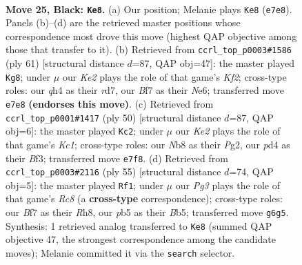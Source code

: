 \documentclass[11pt]{article}
\begin{document}
\clearpage

\begin{figure}[p]\centering
\begin{subfigure}{0.46\textwidth}\centering
\resizebox{\linewidth}{!}{%
\newchessgame
\chessboard[
  setfen={rn6/pp2kb2/1p2p1p1/1P1pP3/1P1P3Q/2N4B/8/4K1N1 b - - 4 25},
  showmover=false,
  pgfstyle=straightmove, color=movearrow, markmove={e7-e8}
]}
\caption{}
\end{subfigure}\hfill
\begin{subfigure}{0.46\textwidth}\centering
\resizebox{\linewidth}{!}{%
\newchessgame
\chessboard[
  setfen={r7/3R1k2/p3nbp1/N1p1pp1p/7P/2P1BPP1/PP6/2K5 b - - 4 31},
  showmover=false,
  pgfstyle=straightmove, color=movearrow, markmove={f7-g8}
]}
\caption{}
\end{subfigure}
\\[4pt]
\begin{subfigure}{0.46\textwidth}\centering
\resizebox{\linewidth}{!}{%
\newchessgame
\chessboard[
  setfen={1k6/5p2/p3p3/4b1r1/2P1Pp1p/5B2/1P3PPP/2K4R w - - 0 26},
  showmover=false,
  pgfstyle=straightmove, color=movearrow, markmove={c1-c2}
]}
\caption{}
\end{subfigure}\hfill
\begin{subfigure}{0.46\textwidth}\centering
\resizebox{\linewidth}{!}{%
\newchessgame
\chessboard[
  setfen={7r/5pk1/p3p2p/Pb2P1p1/1Q5P/1B2P3/1P4PK/2r5 b - - 0 28},
  showmover=false,
  pgfstyle=straightmove, color=movearrow, markmove={c1-f1}
]}
\caption{}
\end{subfigure}
\caption{\textbf{Move 25, Black: \texttt{Ke8}.} (a) Our position; Melanie plays \texttt{Ke8} (\texttt{e7e8}). Panels (b)--(d) are the retrieved master positions whose correspondence most drove this move (highest QAP objective among those that transfer to it). (b) Retrieved from \texttt{ccrl\_top\_p0003\#1586} (ply 61) [structural distance $d$=87, QAP obj=47]: the master played \texttt{Kg8}; under $\mu$ our \emph{Ke2} plays the role of that game's \emph{Kf2}; cross-type roles: our \emph{q}h4 as their \emph{r}d7, our \emph{B}f7 as their \emph{N}e6; transferred move \texttt{e7e8} \textbf{(endorses this move)}. (c) Retrieved from \texttt{ccrl\_top\_p0001\#1417} (ply 50) [structural distance $d$=87, QAP obj=6]: the master played \texttt{Kc2}; under $\mu$ our \emph{Ke2} plays the role of that game's \emph{Kc1}; cross-type roles: our \emph{N}b8 as their \emph{P}g2, our \emph{p}d4 as their \emph{B}f3; transferred move \texttt{e7f8}. (d) Retrieved from \texttt{ccrl\_top\_p0003\#2116} (ply 55) [structural distance $d$=74, QAP obj=5]: the master played \texttt{Rf1}; under $\mu$ our \emph{Pg3} plays the role of that game's \emph{Rc8} (a \textbf{cross-type} correspondence); cross-type roles: our \emph{B}f7 as their \emph{R}h8, our \emph{p}b5 as their \emph{B}b5; transferred move \texttt{g6g5}. Synthesis: 1 retrieved analog transferred to \texttt{Ke8} (summed QAP objective 47, the strongest correspondence among the candidate moves); Melanie committed it via the \texttt{search} selector.}
\label{fig:thought-m49}
\end{figure}
\end{document}
